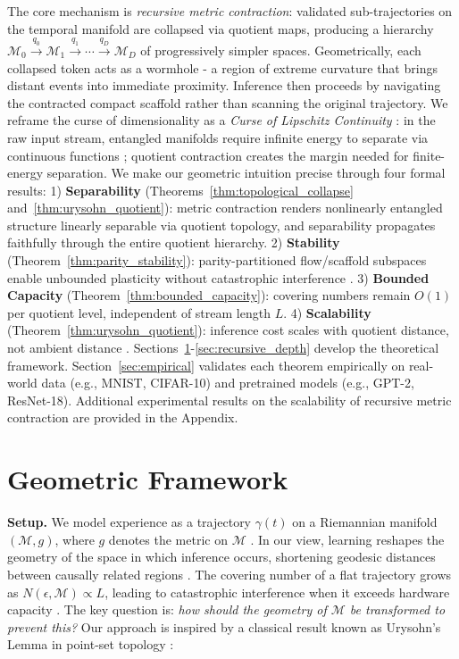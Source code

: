 \documentclass{article}
\begin{document}
The core mechanism is \emph{recursive metric contraction}: validated sub-trajectories on the temporal manifold are collapsed via quotient maps, producing a hierarchy $\mathcal{M}_0 \xrightarrow{q_0} \mathcal{M}_1 \xrightarrow{q_1} \cdots \xrightarrow{q_D} \mathcal{M}_D$ of progressively simpler spaces. Geometrically, each collapsed token acts as a wormhole - a region of extreme curvature that brings distant events into immediate proximity. Inference then proceeds by navigating the contracted compact scaffold rather than scanning the original trajectory. We reframe the curse of dimensionality as a \emph{Curse of Lipschitz Continuity} \cite{bach2017breaking}: in the raw input stream, entangled manifolds require infinite energy to separate via continuous functions \cite{vonLuxburgBousquet2004}; quotient contraction creates the margin needed for finite-energy separation.
We make our geometric intuition precise through four formal results:
1) \textbf{Separability} (Theorems~\ref{thm:topological_collapse} and~\ref{thm:urysohn_quotient}): metric contraction renders nonlinearly entangled structure linearly separable via quotient topology, and separability propagates faithfully through the entire quotient hierarchy. 
2) \textbf{Stability} (Theorem~\ref{thm:parity_stability}): parity-partitioned flow/scaffold subspaces enable unbounded plasticity without catastrophic interference \cite{mccloskey1989catastrophic}.
3) \textbf{Bounded Capacity} (Theorem~\ref{thm:bounded_capacity}): covering numbers remain $O(1)$ per quotient level, independent of stream length $L$.
4) \textbf{Scalability} (Theorem~\ref{thm:urysohn_quotient}): inference cost scales with quotient distance, not ambient distance \cite{gromov1999metric}.
Sections~\ref{sec:geometric_framework}-\ref{sec:recursive_depth} develop the theoretical framework. Section~\ref{sec:empirical} validates each theorem empirically on real-world data (e.g., MNIST, CIFAR-10) and pretrained models (e.g., GPT-2, ResNet-18). Additional experimental results on the scalability of recursive metric contraction are provided in the Appendix.

\section{Geometric Framework}
\label{sec:geometric_framework}

\noindent\textbf{Setup.}
We model experience as a trajectory $\gamma(t)$ on a Riemannian manifold $(\mathcal{M}, g)$, where $g$ denotes the metric on $\mathcal{M}$ \cite{gromov1999metric}.
In our view, learning reshapes the geometry of the space in which inference occurs, shortening geodesic distances between causally related regions \cite{bengio2013representation}.
The covering number of a flat trajectory grows as $N(\epsilon, \mathcal{M}) \propto L$, leading to catastrophic interference when it exceeds hardware capacity \cite{mccloskey1989catastrophic}.
The key question is: \emph{how should the geometry of $\mathcal{M}$ be transformed to prevent this?}
Our approach is inspired by a classical result known as Urysohn's Lemma in point-set topology \cite{willard2012general}:
 
\end{document}
